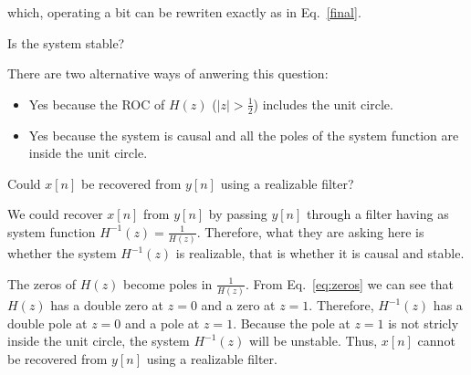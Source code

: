 \documentclass[a4paper,11pt,oneside]{article}
\begin{document}
which, operating a bit can be rewriten exactly as in Eq.~\ref{final}.

Is the system stable?

There are two alternative ways of anwering this question:
\begin{itemize}
\item Yes because the ROC of $H(z)$ ($|z|>\frac{1}{2}$) includes the unit circle.
\item Yes because the system is causal and all the poles of the system function are inside the unit circle.
\end{itemize}


Could $x[n]$ be recovered from $y[n]$ using a realizable filter?

We could recover $x[n]$ from $y[n]$ by passing $y[n]$ through a filter having as system function $H^{-1}(z)=\frac{1}{H(z)}$. Therefore, what they are asking here is whether the system $H^{-1}(z)$ is realizable, that is whether it is causal and stable. 

The zeros of $H(z)$ become poles in $\frac{1}{H(z)}$. From Eq.~\ref{eq:zeros} we can see that $H(z)$ has a double zero at $z=0$ and a zero at $z=1$. Therefore, $H^{-1}(z)$ has a double pole at $z=0$ and a pole at $z=1$. Because the pole at $z=1$ is not stricly inside the unit circle, the system $H^{-1}(z)$ will be unstable. Thus, $x[n]$ cannot be recovered from $y[n]$ using a realizable filter.

\end{document}
